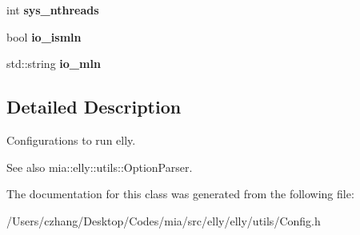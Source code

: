 \begin{DoxyCompactItemize}
\item 
\hypertarget{classmia_1_1elly_1_1utils_1_1_config_ad861f616e2e3ab0783dd63ec97d8e760}{int {\bfseries sys\-\_\-nthreads}}\label{classmia_1_1elly_1_1utils_1_1_config_ad861f616e2e3ab0783dd63ec97d8e760}

\item 
\hypertarget{classmia_1_1elly_1_1utils_1_1_config_ac252f6434061ccf1d01e3ea96c13a91b}{bool {\bfseries io\-\_\-ismln}}\label{classmia_1_1elly_1_1utils_1_1_config_ac252f6434061ccf1d01e3ea96c13a91b}

\item 
\hypertarget{classmia_1_1elly_1_1utils_1_1_config_a1e35f73505f5a384536c8c21bdcbca8a}{std\-::string {\bfseries io\-\_\-mln}}\label{classmia_1_1elly_1_1utils_1_1_config_a1e35f73505f5a384536c8c21bdcbca8a}

\end{DoxyCompactItemize}


\subsection{Detailed Description}
Configurations to run elly. 

\begin{DoxySeeAlso}{See also}
mia\-::elly\-::utils\-::\-Option\-Parser. 
\end{DoxySeeAlso}


The documentation for this class was generated from the following file\-:\begin{DoxyCompactItemize}
\item 
/\-Users/czhang/\-Desktop/\-Codes/mia/src/elly/elly/utils/Config.\-h\end{DoxyCompactItemize}
